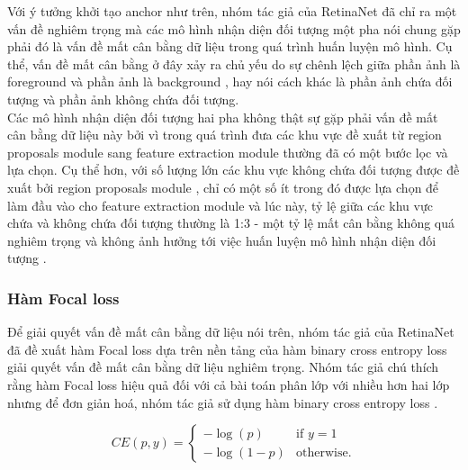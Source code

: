 {    \noindent
    Với ý tưởng khởi tạo anchor  như trên, nhóm tác giả của RetinaNet  đã chỉ ra một vấn đề nghiêm trọng mà các mô hình nhận diện đối tượng  một pha  nói chung gặp phải đó là vấn đề mất cân bằng dữ liệu  trong quá trình huấn luyện mô hình.
    Cụ thể, vấn đề mất cân bằng ở đây xảy ra chủ yếu do sự chênh lệch giữa phần ảnh là foreground  và phần ảnh là background , hay nói cách khác là phần ảnh chứa đối tượng và phần ảnh không chứa đối tượng. \\
    Các mô hình nhận diện đối tượng  hai pha  không thật sự gặp phải vấn đề mất cân bằng dữ liệu  này bởi vì trong quá trình đưa các khu vực đề xuất từ region proposals module  sang feature extraction module  thường đã có một bước lọc và lựa chọn.
    Cụ thể hơn, với số lượng lớn các khu vực không chứa đối tượng được đề xuất bởi region proposals module , chỉ có một số ít trong đó được lựa chọn để làm đầu vào cho feature extraction module  và lúc này, tỷ lệ giữa các khu vực chứa và không chứa đối tượng thường là 1:3 - một tỷ lệ mất cân bằng không quá nghiêm trọng và không ảnh hưởng tới việc huấn luyện mô hình nhận diện đối tượng .

    \subsubsection*{Hàm Focal loss}
    Để giải quyết vấn đề mất cân bằng dữ liệu  nói trên, nhóm tác giả của RetinaNet  đã đề xuất hàm Focal loss  dựa trên nền tảng của hàm binary cross entropy loss  giải quyết vấn đề mất cân bằng dữ liệu  nghiêm trọng.
    Nhóm tác giả chú thích rằng hàm Focal loss  hiệu quả đối với cả bài toán phân lớp với nhiều hơn hai lớp nhưng để đơn giản hoá, nhóm tác giả sử dụng hàm binary cross entropy loss .

    \begin{equation}
        \label{eq:bce}
        CE(p,y) = 
        \begin{cases}
            -\log(p) &\text{if $y = 1$} \\
            -\log (1 - p) &\text{otherwise.}
        \end{cases}
    \end{equation}

}
